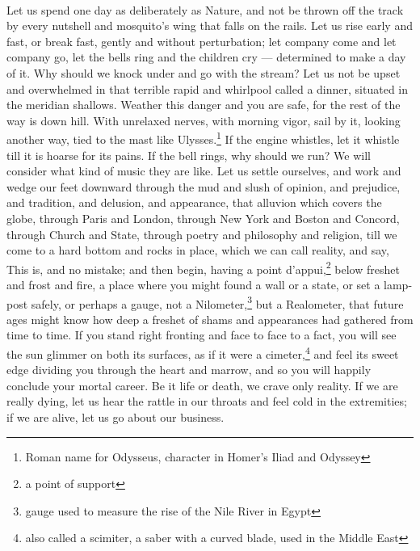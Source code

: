 \documentclass[letterpaper,12pt]{article}
\begin{document}
\paragraph{} Let us spend one day as deliberately as Nature, and not be thrown
off the track by every nutshell and mosquito's wing that falls on the rails. Let
us rise early and fast, or break fast, gently and without perturbation; let
company come and let company go, let the bells ring and the children cry ---
determined to make a day of it. Why should we knock under and go with the
stream? Let us not be upset and overwhelmed in that terrible rapid and whirlpool
called a dinner, situated in the meridian shallows. Weather this danger and you
are safe, for the rest of the way is down hill. With unrelaxed nerves, with
morning vigor, sail by it, looking another way, tied to the mast like
Ulysses.\footnote{Roman name for Odysseus, character in Homer's Iliad and
    Odyssey} If the engine whistles, let it whistle till it is hoarse for its
pains. If the bell rings, why should we run? We will consider what kind of music
they are like. Let us settle ourselves, and work and wedge our feet downward
through the mud and slush of opinion, and prejudice, and tradition, and
delusion, and appearance, that alluvion which covers the globe, through Paris
and London, through New York and Boston and Concord, through Church and State,
through poetry and philosophy and religion, till we come to a hard bottom and
rocks in place, which we can call reality, and say, This is, and no mistake; and
then begin, having a point d'appui,\footnote{a point of support} below freshet
and frost and fire, a place where you might found a wall or a state, or set
a lamp-post safely, or perhaps a gauge, not a Nilometer,\footnote{gauge used to
    measure the rise of the Nile River in Egypt} but a Realometer, that future
ages might know how deep a freshet of shams and appearances had gathered from
time to time. If you stand right fronting and face to face to a fact, you will
see the sun glimmer on both its surfaces, as if it were a cimeter,\footnote{also
    called a scimiter, a saber with a curved blade, used in the Middle East} and
feel its sweet edge dividing you through the heart and marrow, and so you will
happily conclude your mortal career. Be it life or death, we crave only reality.
If we are really dying, let us hear the rattle in our throats and feel cold in
the extremities; if we are alive, let us go about our business.
\end{document}
